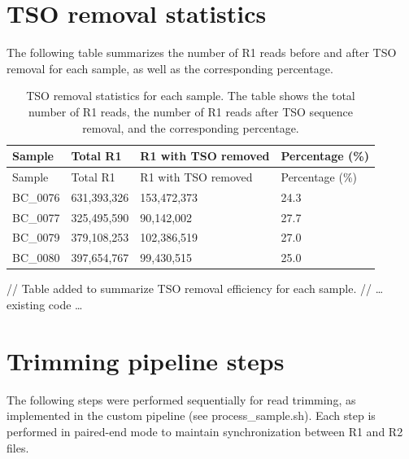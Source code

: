 \documentclass[
  11pt,
  a4paper,
]{report}
\begin{document}
\section{TSO removal statistics}\label{sec-appendix-tso}

The following table summarizes the number of R1 reads before and after
TSO removal for each sample, as well as the corresponding percentage.

\begin{longtable}[]{@{}llll@{}}
\caption{TSO removal statistics for each sample. The table shows the
total number of R1 reads, the number of R1 reads after TSO sequence
removal, and the corresponding
percentage.}\label{tbl-tso-removal}\tabularnewline
\toprule\noalign{}
Sample & Total R1 & R1 with TSO removed & Percentage (\%) \\
\midrule\noalign{}
\endfirsthead
\toprule\noalign{}
Sample & Total R1 & R1 with TSO removed & Percentage (\%) \\
\midrule\noalign{}
\endhead
\bottomrule\noalign{}
\endlastfoot
BC\_0076 & 631,393,326 & 153,472,373 & 24.3 \\
BC\_0077 & 325,495,590 & 90,142,002 & 27.7 \\
BC\_0079 & 379,108,253 & 102,386,519 & 27.0 \\
BC\_0080 & 397,654,767 & 99,430,515 & 25.0 \\
\end{longtable}

// Table added to summarize TSO removal efficiency for each sample. //
\ldots{} existing code \ldots{}

\section{Trimming pipeline steps}\label{sec-appendix-trimming-steps}

The following steps were performed sequentially for read trimming, as
implemented in the custom pipeline (see process\_sample.sh). Each step
is performed in paired-end mode to maintain synchronization between R1
and R2 files.
\end{document}
